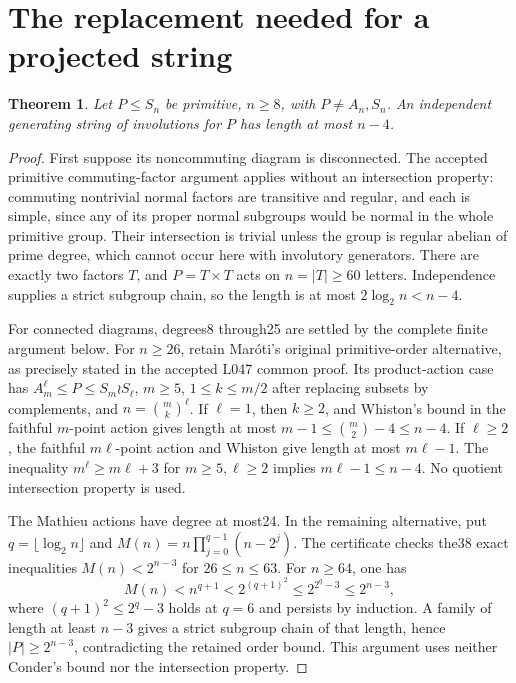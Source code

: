 \documentclass[11pt,a4paper]{article}
\newtheorem{theorem}{Theorem}
\begin{document}
\section{The replacement needed for a projected string}
\begin{theorem}\label{replacement}
Let $P\le S_n$ be primitive, $n\ge8$, with $P\ne A_n,S_n$.
An independent generating string of involutions for $P$ has length
at most $n-4$.
\end{theorem}
\begin{proof}
First suppose its noncommuting diagram is disconnected. The accepted
primitive commuting-factor argument applies without an intersection
property: commuting nontrivial normal factors are transitive and
regular, and each is simple, since any of its proper normal subgroups
would be normal in the whole primitive group. Their intersection is
trivial unless the group is regular abelian of prime degree, which
cannot occur here with involutory generators. There are exactly two
factors $T$, and $P=T\times T$ acts on $n=|T|\ge60$ letters.
Independence supplies a strict subgroup chain, so the length is at most
$2\log_2n<n-4$.

For connected diagrams, degrees8 through25 are settled by the complete
finite argument below. For $n\ge26$, retain Mar\'oti's original
primitive-order alternative, as precisely stated in the accepted L047
common proof. Its product-action case has
$A_m^\ell\le P\le S_m\wr S_\ell$, $m\ge5$,
$1\le k\le m/2$ after replacing subsets by complements, and
$n=\binom mk^\ell$. If $\ell=1$, then $k\ge2$, and Whiston's
bound in the faithful $m$-point action gives length at most
$m-1\le\binom m2-4\le n-4$. If $\ell\ge2$, the faithful
$m\ell$-point action and Whiston give length at most $m\ell-1$.
The inequality $m^\ell\ge m\ell+3$ for $m\ge5,\ell\ge2$
implies $m\ell-1\le n-4$. No quotient intersection property is used.

The Mathieu actions have degree at most24. In the remaining alternative,
put $q=\lfloor\log_2n\rfloor$ and
$M(n)=n\prod_{j=0}^{q-1}(n-2^j)$. The certificate checks the38 exact
inequalities $M(n)<2^{n-3}$ for $26\le n\le63$.
For $n\ge64$, one has
\[
 M(n)<n^{q+1}<2^{(q+1)^2}\le2^{2^q-3}\le2^{n-3},
\]
where $(q+1)^2\le2^q-3$ holds at $q=6$ and persists by induction.
A family of length at least $n-3$ gives a strict subgroup chain of
that length, hence $|P|\ge2^{n-3}$, contradicting the retained order
bound. This argument uses neither Conder's bound nor the intersection
property.
\end{proof}
\end{document}
